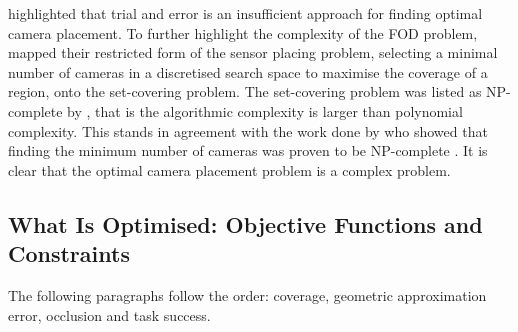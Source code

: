 \citet{olague2002optimal} highlighted that trial and error is an insufficient approach for finding optimal camera placement.
To further highlight the complexity of the FOD problem, \citet{tarbox1995planning} mapped their restricted form of the sensor placing problem, selecting a minimal number of cameras in a discretised search space to maximise the coverage of a region,  onto the set-covering problem. The set-covering problem was listed as NP-complete by \citet{karp1972reducibility}, that is the algorithmic complexity is larger than polynomial complexity. This stands in agreement with the work done by \citet{lee1986computational} who showed that finding the minimum number of cameras was proven to be NP-complete \cite{lee1986computational}.
It is clear that the optimal camera placement problem is a complex problem.


\subsection{What Is Optimised: Objective Functions and Constraints}

The following paragraphs follow the order: coverage, geometric approximation error, occlusion and task success.

